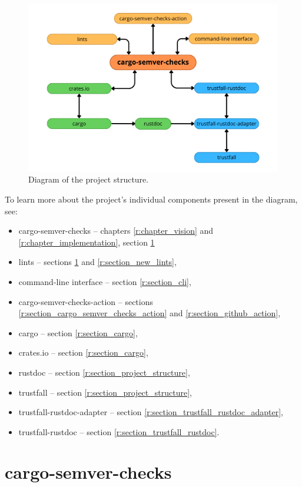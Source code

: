 \documentclass[licencjacka,en]{pracamgr}
\begin{document}
\begin{figure}[h]
	\centering
	\includegraphics[width=\linewidth]{project-structure-diagram.png}
	\caption{Diagram of the project structure.}
\end{figure}

To learn more about the project's individual components present in the diagram, see:
\begin{itemize}
	\item cargo-semver-checks -- chapters \ref{r:chapter_vision}
		and \ref{r:chapter_implementation}, section \ref{r:section_cargo_semver_checks}
	\item lints -- sections \ref{r:section_cargo_semver_checks} and \ref{r:section_new_lints},
	\item command-line interface -- section \ref{r:section_cli},
	\item cargo-semver-checks-action -- sections \ref{r:section_cargo_semver_checks_action}
		and \ref{r:section_github_action},
	\item cargo -- section \ref{r:section_cargo},
	\item crates.io -- section \ref{r:section_cargo},
	\item rustdoc -- section \ref{r:section_project_structure},
	\item trustfall -- section \ref{r:section_project_structure},
	\item trustfall-rustdoc-adapter -- section \ref{r:section_trustfall_rustdoc_adapter},
	\item trustfall-rustdoc -- section \ref{r:section_trustfall_rustdoc}.
\end{itemize}

\section{cargo-semver-checks}\label{r:section_cargo_semver_checks}
\end{document}

